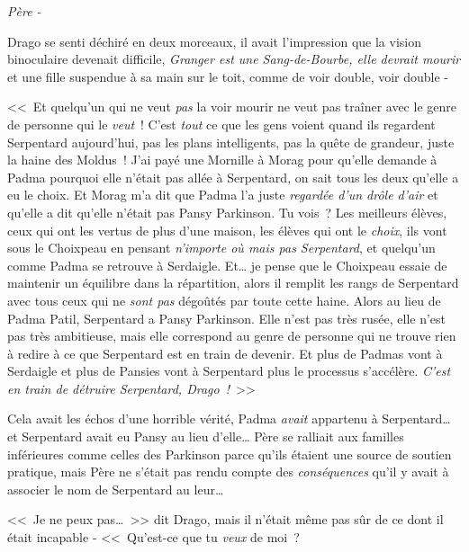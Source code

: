 \emph{Père -}

Drago se senti déchiré en deux morceaux, il avait l'impression que la vision binoculaire devenait difficile, \emph{Granger est une Sang-de-Bourbe, elle devrait mourir} et une fille suspendue à sa main sur le toit, comme de voir double, voir double -

<<~Et quelqu'un qui ne veut \emph{pas} la voir mourir ne veut pas traîner avec le genre de personne qui le \emph{veut}~! C'est \emph{tout} ce que les gens voient quand ils regardent Serpentard aujourd'hui, pas les plans intelligents, pas la quête de grandeur, juste la haine des Moldus~! J'ai payé une Mornille à Morag pour qu'elle demande à Padma pourquoi elle n'était pas allée à Serpentard, on sait tous les deux qu'elle a eu le choix. Et Morag m'a dit que Padma l'a juste \emph{regardée d'un drôle d'air} et qu'elle a dit qu'elle n'était pas Pansy Parkinson. Tu vois~? Les meilleurs élèves, ceux qui ont les vertus de plus d'une maison, les élèves qui ont le \emph{choix}, ils vont sous le Choixpeau en pensant \emph{n'importe où mais pas Serpentard}, et quelqu'un comme Padma se retrouve à Serdaigle. Et… je pense que le Choixpeau essaie de maintenir un équilibre dans la répartition, alors il remplit les rangs de Serpentard avec tous ceux qui ne \emph{sont pas} dégoûtés par toute cette haine. Alors au lieu de Padma Patil, Serpentard a Pansy Parkinson. Elle n'est pas très rusée, elle n'est pas très ambitieuse, mais elle correspond au genre de personne qui ne trouve rien à redire à ce que Serpentard est en train de devenir. Et plus de Padmas vont à Serdaigle et plus de Pansies vont à Serpentard plus le processus s'accélère. \emph{C'est en train de détruire Serpentard, Drago~!}~>>

Cela avait les échos d'une horrible vérité, Padma \emph{avait} appartenu à Serpentard… et Serpentard avait eu Pansy au lieu d'elle… Père se ralliait aux familles inférieures comme celles des Parkinson parce qu'ils étaient une source de soutien pratique, mais Père ne s'était pas rendu compte des \emph{conséquences} qu'il y avait à associer le nom de Serpentard au leur…

<<~Je ne peux pas…~>> dit Drago, mais il n'était même pas sûr de ce dont il était incapable - <<~Qu'est-ce que tu \emph{veux} de moi~?

